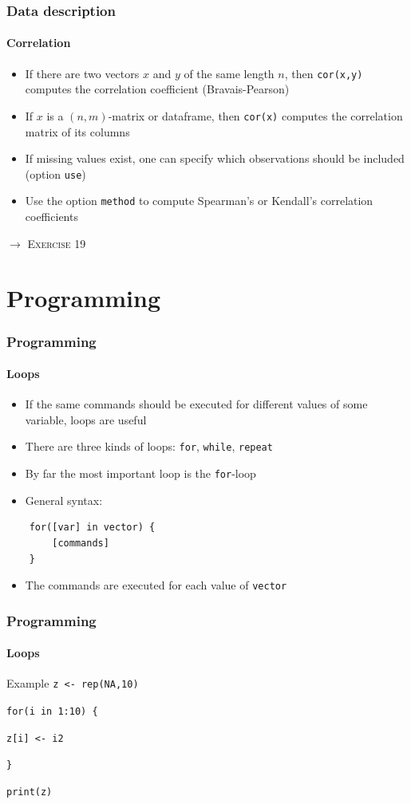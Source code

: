 \documentclass[title={Introduction to R}, author={Mutschler and Zaharieva}, inst={Institute for Econometrics and Empirical Economics}]{beamer}
\begin{document}
\begin{frame}
\frametitle{Data description}
\framesubtitle{Correlation}
\begin{itemize}
\item If there are two vectors $x$ and $y$ of the same length $n$, then 
\texttt{cor(x,y)} computes the correlation coefficient (Bravais-Pearson)
\item If $x$ is a $\left( n,m\right) $-matrix or dataframe, then \texttt{cor(x)} computes the correlation matrix of its columns
\item If missing values exist, one can specify which observations should be
included (option \texttt{use})
\item Use the option \texttt{method} to compute Spearman's or Kendall's
correlation coefficients
\end{itemize}\pause
$\longrightarrow $ \textsc{Exercise 19}
\end{frame}


\section{Programming}


\begin{frame}[fragile]
\frametitle{Programming}
\framesubtitle{Loops}
\begin{itemize}
\item If the same commands should be executed for different values of some
variable, loops are useful
\item There are three kinds of loops: \texttt{for}, \texttt{while}, \texttt{repeat}
\item By far the most important loop is the \texttt{for}-loop
\item General syntax:
\end{itemize}
\begin{verbatim}
    for([var] in vector) {
        [commands]
    }
\end{verbatim}
\begin{itemize}
\item The commands are executed for each value of \texttt{vector}
\end{itemize}
\end{frame}


\begin{frame}
\frametitle{Programming}
\framesubtitle{Loops}
\begin{block}{Example}
\texttt{z <- rep(NA,10)}

\texttt{for(i in 1:10) \{}

\quad \quad \texttt{z[i] <- i2}

\texttt{\}}

\texttt{print(z)}
\end{block}
\end{frame}
\end{document}

